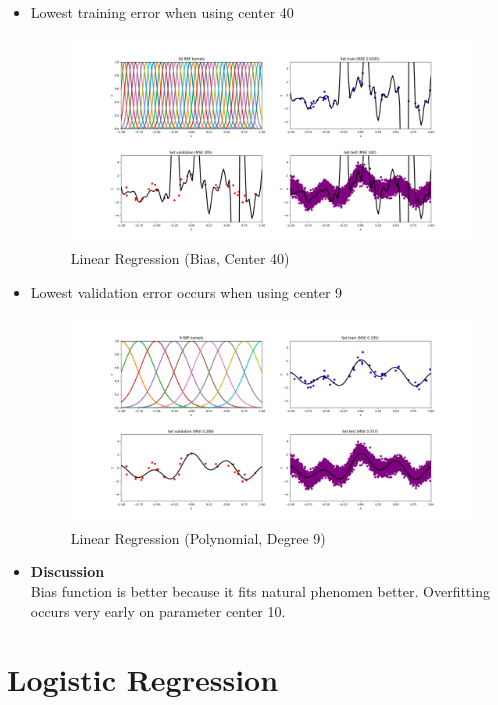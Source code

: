 \documentclass[12pt,halfline,a4paper]{ouparticle}
\begin{document}
\begin{itemize}
  \item Lowest training error when using center 40
  	\begin{figure}[H]
    \centering
	        \includegraphics[width=\textwidth]{figures/linreg_bias_c40.png}
	    \caption{Linear Regression (Bias, Center 40)}
	\end{figure}
  \item Lowest validation error occurs when using center 9
	\begin{figure}[H]
    \centering
	        \includegraphics[width=\textwidth]{figures/linreg_bias_c9.png}
	    \caption{Linear Regression (Polynomial, Degree 9)}
	\end{figure}
		
  \item \textbf{Discussion}\\
  Bias function is better because it fits natural phenomen better. Overfitting
  occurs very early on parameter center 10.
  
\end{itemize}

\section{Logistic Regression}
\end{document}
